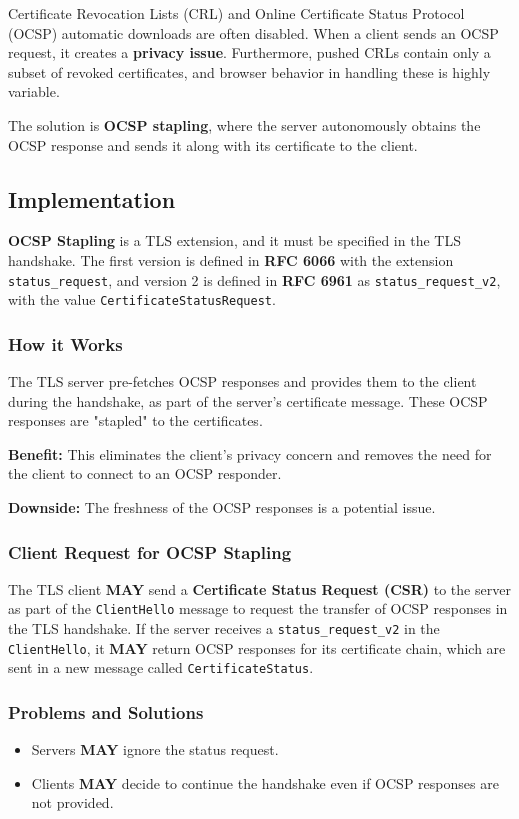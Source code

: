 Certificate Revocation Lists (CRL) and Online Certificate Status Protocol (OCSP) automatic downloads are often disabled. When a client sends an OCSP request, it creates a \textbf{privacy issue}. Furthermore, pushed CRLs contain only a subset of revoked certificates, and browser behavior in handling these is highly variable.

The solution is \textbf{OCSP stapling}, where the server autonomously obtains the OCSP response and sends it along with its certificate to the client.

\subsection{Implementation}

\textbf{OCSP Stapling} is a TLS extension, and it must be specified in the TLS handshake. The first version is defined in \textbf{RFC 6066} with the extension \texttt{status\_request}, and version 2 is defined in \textbf{RFC 6961} as \texttt{status\_request\_v2}, with the value \texttt{CertificateStatusRequest}.

\subsubsection{How it Works}
The TLS server pre-fetches OCSP responses and provides them to the client during the handshake, as part of the server's certificate message. These OCSP responses are "stapled" to the certificates.

\textbf{Benefit:} This eliminates the client's privacy concern and removes the need for the client to connect to an OCSP responder.

\textbf{Downside:} The freshness of the OCSP responses is a potential issue.

\subsubsection{Client Request for OCSP Stapling}
The TLS client \textbf{MAY} send a \textbf{Certificate Status Request (CSR)} to the server as part of the \texttt{ClientHello} message to request the transfer of OCSP responses in the TLS handshake. If the server receives a \texttt{status\_request\_v2} in the \texttt{ClientHello}, it \textbf{MAY} return OCSP responses for its certificate chain, which are sent in a new message called \texttt{CertificateStatus}.

\subsubsection{Problems and Solutions}
\begin{itemize}
    \item Servers \textbf{MAY} ignore the status request.
    \item Clients \textbf{MAY} decide to continue the handshake even if OCSP responses are not provided.
\end{itemize}


